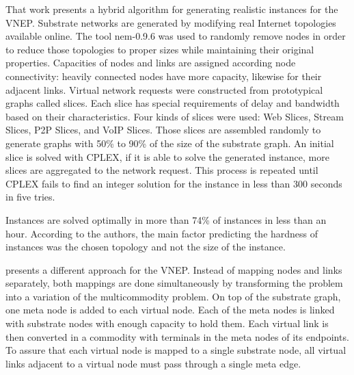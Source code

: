 That work presents a hybrid algorithm for generating realistic instances for the VNEP\@.
Substrate networks are generated by modifying real Internet topologies available online.
The tool nem-0.9.6 was used to randomly remove nodes in order to reduce those topologies to proper sizes while maintaining their original properties.
Capacities of nodes and links are assigned according node connectivity: heavily connected nodes have more capacity, likewise for their adjacent links.
Virtual network requests were constructed from prototypical graphs called slices. Each slice has special requirements of delay and bandwidth based on their characteristics. Four kinds of slices were used: Web Slices, Stream Slices, P2P Slices, and VoIP Slices. Those slices are assembled randomly to generate graphs with 50\% to 90\% of the size of the substrate graph. An initial slice is solved with CPLEX, if it is able to solve the generated instance, more slices are aggregated to the network request. This process is repeated until CPLEX fails to find an integer solution for the instance in less than 300 seconds in five tries.

Instances are solved optimally in more than 74\% of instances in less than an hour. According to the authors, the main factor predicting the hardness of instances was the chosen topology and not the size of the instance.



\citet{Chowdhury:2012} presents a different approach for the VNEP\@. Instead of mapping nodes and links separately, both mappings are done simultaneously by transforming the problem into a variation of the multicommodity problem. On top of the substrate graph, one meta node is added to each virtual node. Each of the meta nodes is linked with substrate nodes with enough capacity to hold them. Each virtual link is then converted in a commodity with terminals in the meta nodes of its endpoints. To assure that each virtual node is mapped to a single substrate node, all virtual links adjacent to a virtual node must pass through a single meta edge.

